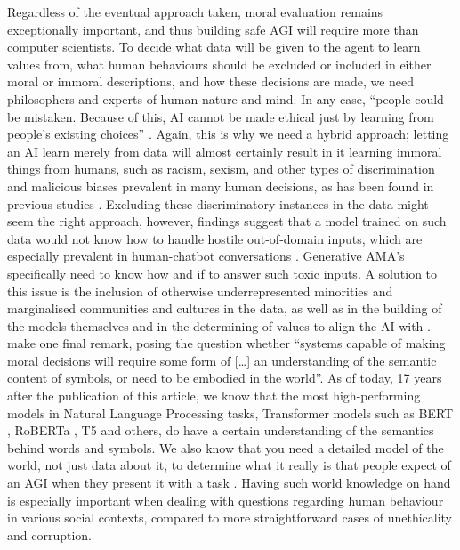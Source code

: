 \documentclass[final]{clv3} %
\begin{document}
Regardless of the eventual approach taken, moral evaluation remains exceptionally important, and thus building safe AGI will require more than computer scientists. To decide what data will be given to the agent to learn values from, what human behaviours should be excluded or included in either moral or immoral descriptions, and how these decisions are made, we need philosophers and experts of human nature and mind. In any case, “people could be mistaken. Because of this, AI cannot be made ethical just by learning from people’s existing choices” \cite[p. 6]{gabriel}. Again, this is why we need a hybrid approach; letting an AI learn merely from data will almost certainly result in it learning immoral things from humans, such as racism, sexism, and other types of discrimination and malicious biases prevalent in many human decisions, as has been found in previous studies \cite{schramowski, howard}. Excluding these discriminatory instances in the data might seem the right approach, however, findings suggest that a model trained on such data would not know how to handle hostile out-of-domain inputs, which are especially prevalent in human-chatbot conversations \cite{xu}. Generative AMA’s specifically need to know how and if to answer such toxic inputs. A solution to this issue is the inclusion of otherwise underrepresented minorities and marginalised communities and cultures in the data, as well as in the building of the models themselves and in the determining of values to align the AI with \cite{gabriel}.\\

\citet[p. 154]{allen2005} make one final remark, posing the question whether “systems capable of making moral decisions will require some form of […] an understanding of the semantic content of symbols, or need to be embodied in the world”. As of today, 17 years after the publication of this article, we know that the most high-performing models in Natural Language Processing tasks, Transformer models such as BERT \cite{devlin}, RoBERTa \cite{liu}, T5 \cite{raffel} and others, do have a certain understanding of the semantics behind words and symbols. We also know that you need a detailed model of the world, not just data about it, to determine what it really is that people expect of an AGI when they present it with a task \cite{tegmark}. Having such world knowledge on hand is especially important when dealing with questions regarding human behaviour in various social contexts, compared to more straightforward cases of unethicality and corruption. 
\end{document}
